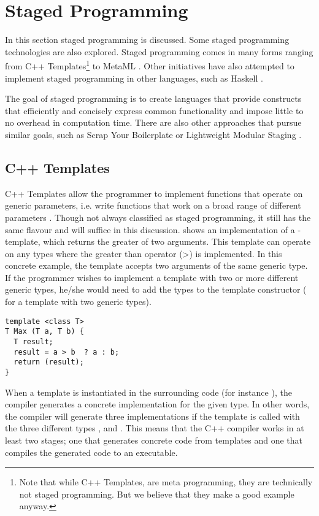 \section{Staged Programming}
In this section staged programming is discussed. Some staged programming technologies are also explored. Staged programming comes in many forms ranging from C++ Templates\footnote{Note that while C++ Templates, are meta programming, they are technically not staged programming. But we believe that they make a good example anyway.} \cite{c++:templates} to MetaML \cite{sheard1998using}. Other initiatives have also attempted to implement staged programming in other languages, such as Haskell \cite{sheard2002template}.

The goal of staged programming is to create languages that provide constructs that efficiently and concisely express common functionality and impose little to no overhead in computation time. There are also other approaches that pursue similar goals, such as Scrap Your Boilerplate \cite{lammel2003scrap} or Lightweight Modular Staging \cite{rompf2010lightweight}.

\subsection{C++ Templates}
C++ Templates allow the programmer to implement functions that operate on generic parameters, i.e. write functions that work on a broad range of different parameters \cite{c++:templates:tutorial}. Though not always classified as staged programming, it still has the same flavour and will suffice in this discussion.
 shows an implementation of a -template, which returns the greater of two arguments. This template can operate on any types where the greater than operator (\textgreater) is implemented. In this concrete example, the template accepts two arguments of the same generic type. If the programmer wishes to implement a template with two or more different generic types, he/she would need to add the types to the template constructor ( for a template with two generic types).

\begin{lstlisting}[label={lst:c++:max:template}, caption={\ttt{Max}-function template in C++}]
template <class T>
T Max (T a, T b) {
  T result;
  result = a > b  ? a : b;
  return (result);
}
\end{lstlisting}

When a template is instantiated in the surrounding code (for instance ), the compiler generates a concrete implementation for the given type. In other words, the compiler will generate three implementations if the template is called with the three different types ,  and . This means that the C++ compiler works in at least two stages; one that generates concrete code from templates and one that compiles the generated code to an executable.

